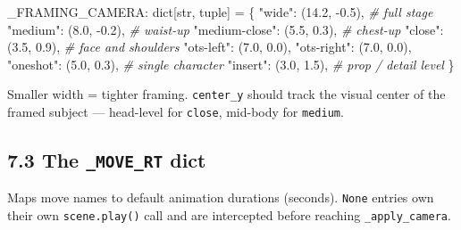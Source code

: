 \documentclass[
  12pt,
  letterpaper,
]{book}
\newenvironment{Shaded}{}{}
\newcommand{\BuiltInTok}[1]{\textcolor[rgb]{0.00,0.50,0.00}{#1}}
\newcommand{\CommentTok}[1]{\textcolor[rgb]{0.38,0.63,0.69}{\textit{#1}}}
\newcommand{\FloatTok}[1]{\textcolor[rgb]{0.25,0.63,0.44}{#1}}
\newcommand{\NormalTok}[1]{#1}
\newcommand{\OperatorTok}[1]{\textcolor[rgb]{0.40,0.40,0.40}{#1}}
\newcommand{\StringTok}[1]{\textcolor[rgb]{0.25,0.44,0.63}{#1}}
\begin{document}
\begin{Shaded}
\begin{Highlighting}[]
\NormalTok{\_FRAMING\_CAMERA: }\BuiltInTok{dict}\NormalTok{[}\BuiltInTok{str}\NormalTok{, }\BuiltInTok{tuple}\NormalTok{] }\OperatorTok{=}\NormalTok{ \{}
    \StringTok{"wide"}\NormalTok{:         (}\FloatTok{14.2}\NormalTok{, }\OperatorTok{{-}}\FloatTok{0.5}\NormalTok{),   }\CommentTok{\# full stage}
    \StringTok{"medium"}\NormalTok{:       (}\FloatTok{8.0}\NormalTok{,  }\OperatorTok{{-}}\FloatTok{0.2}\NormalTok{),   }\CommentTok{\# waist{-}up}
    \StringTok{"medium{-}close"}\NormalTok{: (}\FloatTok{5.5}\NormalTok{,   }\FloatTok{0.3}\NormalTok{),   }\CommentTok{\# chest{-}up}
    \StringTok{"close"}\NormalTok{:        (}\FloatTok{3.5}\NormalTok{,   }\FloatTok{0.9}\NormalTok{),   }\CommentTok{\# face and shoulders}
    \StringTok{"ots{-}left"}\NormalTok{:     (}\FloatTok{7.0}\NormalTok{,   }\FloatTok{0.0}\NormalTok{),}
    \StringTok{"ots{-}right"}\NormalTok{:    (}\FloatTok{7.0}\NormalTok{,   }\FloatTok{0.0}\NormalTok{),}
    \StringTok{"oneshot"}\NormalTok{:      (}\FloatTok{5.0}\NormalTok{,   }\FloatTok{0.3}\NormalTok{),   }\CommentTok{\# single character}
    \StringTok{"insert"}\NormalTok{:       (}\FloatTok{3.0}\NormalTok{,   }\FloatTok{1.5}\NormalTok{),   }\CommentTok{\# prop / detail level}
\NormalTok{\}}
\end{Highlighting}
\end{Shaded}

Smaller width = tighter framing. \texttt{center\_y} should track the
visual center of the framed subject --- head-level for \texttt{close},
mid-body for \texttt{medium}.

\subsection{\texorpdfstring{7.3 The \texttt{\_MOVE\_RT}
dict}{7.3 The \_MOVE\_RT dict}}\label{the-_move_rt-dict}

Maps move names to default animation durations (seconds). \texttt{None}
entries own their own \texttt{scene.play()} call and are intercepted
before reaching \texttt{\_apply\_camera}.
\end{document}
